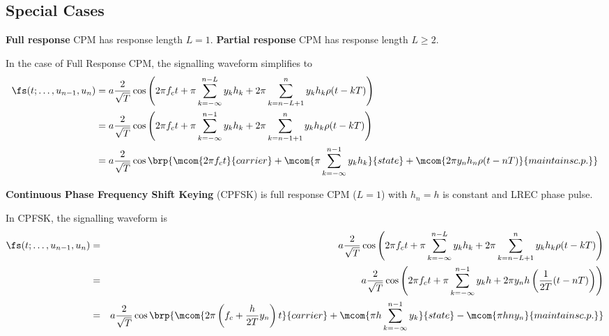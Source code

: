 \subsection{Special Cases}
\begin{definition}
{\bf Full response} CPM has response length $L=1$.
{\bf Partial response} CPM has response length $L\ge2$.
\end{definition}

In the case of Full Response CPM, the signalling waveform simplifies to
\begin{align*}
   \fs(t;\ldots,u_{n-1},u_n)
     &= a \frac{2}{\sqrt{T}} 
          \cos\left(
             2\pi f_ct + 
             \pi \sum_{k=-\infty}^{n-L} y_k h_k  + 
             2\pi \sum_{k=n-L+1}^n y_k h_k \rho(t-kT)
          \right)
   \\&= a \frac{2}{\sqrt{T}} 
          \cos\left(
             2\pi f_ct + 
             \pi \sum_{k=-\infty}^{n-1} y_k h_k  + 
             2\pi \sum_{k=n-1+1}^n y_k h_k \rho(t-kT)
          \right)
   \\&= a \frac{2}{\sqrt{T}} 
          \cos\brp{
             \mcom{2\pi f_ct}{carrier} +
             \mcom{\pi \sum_{k=-\infty}^{n-1} y_k h_k}{state}  +
             \mcom{2\pi y_n h_n \rho(t-nT)}{maintains c.p.}
             }
\end{align*}


\begin{definition}
{\bf Continuous Phase Frequency Shift Keying} (CPFSK)
is full response CPM ($L=1$) with $h_n=h$ is constant
and LREC phase pulse.
\end{definition}

In CPFSK, the signalling waveform is
\begin{align*}
   \fs(t;\ldots,u_{n-1},u_n)
     &=& a \frac{2}{\sqrt{T}} 
           \cos\left(
              2\pi f_ct + 
              \pi \sum_{k=-\infty}^{n-L} y_k h_k  + 
              2\pi \sum_{k=n-L+1}^n y_k h_k \rho(t-kT)
           \right)
   \\&=& a \frac{2}{\sqrt{T}} 
           \cos\left(
              2\pi f_ct + 
              \pi \sum_{k=-\infty}^{n-1} y_k h  + 
              2\pi y_n h 
              \left( \frac{1}{2T}(t-nT)  \right)
           \right)
   \\&=& a \frac{2}{\sqrt{T}} 
           \cos\brp{
             \mcom{2\pi \left(f_c +  \frac{h}{2T}y_n \right)t}{carrier} +
             \mcom{\pi h\sum_{k=-\infty}^{n-1} y_k }{state}  -
             \mcom{\pi hn y_n }{maintains c.p.}
             }
\end{align*}


